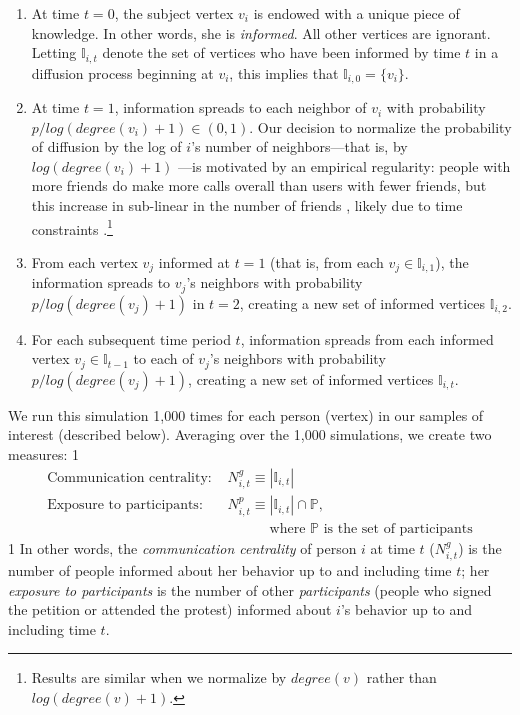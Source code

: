 \documentclass[12pt]{article}
\newcommand{\jop}{0} %
\begin{document}
\begin{enumerate}
\item At time $t=0$, the subject vertex $v_i$ is endowed with a unique piece of knowledge. In other words, she is \emph{informed}. All other vertices are ignorant. Letting $\mathbb{I}_{i, t}$ denote the set of vertices who have been informed by time $t$ in a diffusion process beginning at $v_i$, this implies that $\mathbb{I}_{i,0} = \{v_i\}$.
\item At time $t=1$, information spreads to each neighbor of $v_i$ with probability $p / log(degree(v_i)+1)  \in(0,1)$. Our decision to normalize the probability of diffusion by the log of $i$'s number of neighbors---that is, by $log(degree(v_i)+1)$ ---is motivated by an empirical regularity: people with more friends do make more calls overall than users with fewer friends, but this increase in sub-linear in the number of friends \citep{Miritello:2013bl}, likely due to time constraints \citep[see also][]{Larson:2016uz}.\footnote{Results are similar when we normalize by $degree(v)$ rather than $log(degree(v)+1)$.}
\item From each vertex $v_j$ informed at $t=1$ (that is, from each $v_j \in \mathbb{I}_{i,1}$), the information spreads to $v_j$'s neighbors with probability $p / log(degree(v_j)+1)$ in $t=2$,  creating a new set of informed vertices $\mathbb{I}_{i,2}$.
\item For each subsequent time period $t$, information spreads from each informed vertex $v_j \in \mathbb{I}_{t-1}$ to each of $v_j$'s neighbors with probability $p / log(degree(v_j)+1)$, creating  a new set of informed vertices $\mathbb{I}_{i,t}$.
\end{enumerate}

We run this simulation 1,000 times for each person (vertex) in our samples of interest (described below). Averaging over the 1,000 simulations, we create two measures:
\if\jop1
\linespread{1}\selectfont
\fi
\begin{align*}
\text{Communication centrality: } & N_{i,t}^g \equiv |\mathbb{I}_{i,t}| \\
\text{Exposure to participants: } & N_{i,t}^p \equiv |\mathbb{I}_{i,t}| \cap \mathbb{P}, \\[-.5em] & \qquad \quad \text{where $\mathbb{P}$ is the set of participants}
\end{align*}
\if\jop1
\linespread{2}\selectfont
\fi
In other words, the \emph{communication centrality} of person $i$ at time $t$ ($N_{i,t}^g$) is the number of people informed about her behavior up to and including time $t$; her \emph{exposure to participants} is the number of other \emph{participants} (people who signed the petition or attended the protest) informed about $i$'s behavior up to and including time $t$.
\end{document}
